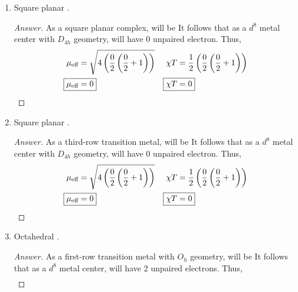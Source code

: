 \documentclass[../psets.tex]{subfiles}
\begin{document}
\begin{enumerate}
\begin{enumerate}
\begin{proof}[Answer]
            \begin{align*}
                \mu_\text{eff} &= \sqrt{4\left( \frac{1}{2}\left( \frac{1}{2}+1 \right) \right)}&
                    \chi T &= \frac{1}{2}\left( \frac{1}{2}\left( \frac{1}{2}+1 \right) \right)\\
                \Aboxed{\mu_\text{eff} &= 1.73}&
                    \Aboxed{\chi T &= 0.375}
            \end{align*}
        \end{proof}
        \item Square planar .
        \begin{proof}[Answer]
            As a square planar complex,  will be  It follows that as a $d^8$ metal center with $D_{4h}$ geometry,  will have 0 unpaired electron. Thus,
            \begin{align*}
                \mu_\text{eff} &= \sqrt{4\left( \frac{0}{2}\left( \frac{0}{2}+1 \right) \right)}&
                    \chi T &= \frac{1}{2}\left( \frac{0}{2}\left( \frac{0}{2}+1 \right) \right)\\
                \Aboxed{\mu_\text{eff} &= 0}&
                    \Aboxed{\chi T &= 0}
            \end{align*}
        \end{proof}
        \item Square planar .
        \begin{proof}[Answer]
            As a third-row transition metal,  will be  It follows that as a $d^8$ metal center with $D_{4h}$ geometry,  will have 0 unpaired electron. Thus,
            \begin{align*}
                \mu_\text{eff} &= \sqrt{4\left( \frac{0}{2}\left( \frac{0}{2}+1 \right) \right)}&
                    \chi T &= \frac{1}{2}\left( \frac{0}{2}\left( \frac{0}{2}+1 \right) \right)\\
                \Aboxed{\mu_\text{eff} &= 0}&
                    \Aboxed{\chi T &= 0}
            \end{align*}
        \end{proof}
        \item Octahedral .
        \begin{proof}[Answer]
            As a first-row transition metal with $O_h$ geometry,  will be  It follows that as a $d^8$ metal center,  will have 2 unpaired electrons. Thus,
            \begin{align*}

\end{align*}
\end{proof}
\end{enumerate}
\end{enumerate}
\end{document}
